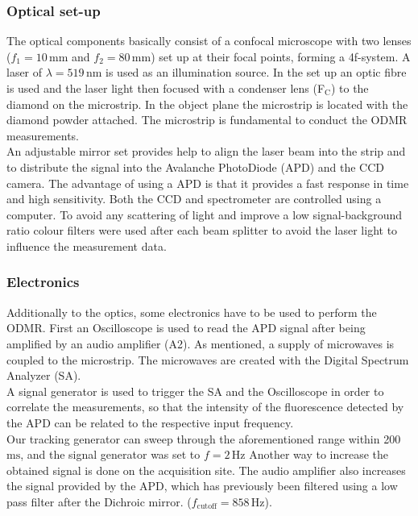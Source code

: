  \subsubsection{Optical set-up}
 
The optical components basically consist of a confocal microscope with two lenses ($f_{1}=10\,\mathrm{mm}$ and $f_{2}=80\,\mathrm{mm}$) set up at their focal points, forming a 4f-system. A laser of $\lambda=519\,\mathrm{nm}$ is used as an illumination source. In the set up an optic fibre is used and the laser light then focused with a condenser lens (F$_\mathrm{C}$) to the diamond on the microstrip.
In the object plane the microstrip is located with the diamond powder attached. The microstrip is fundamental to conduct the ODMR measurements.\\

An adjustable mirror set provides help to align the laser beam into the strip and to distribute the signal into the Avalanche PhotoDiode (APD) and the CCD camera. The advantage of using a APD is that it provides a fast response in time and high sensitivity. Both the CCD and spectrometer are controlled using a computer. To avoid any scattering of light and improve a low signal-background ratio colour filters were used after each beam splitter to avoid the laser light to influence the measurement data.

\subsubsection{Electronics}

Additionally to the optics, some electronics have to be used to perform the ODMR. First an Oscilloscope is used to read the APD signal after being amplified by an audio amplifier (A2). As mentioned, a supply of microwaves is coupled to the microstrip. The microwaves are created with the Digital Spectrum Analyzer (SA).\\

A signal generator is used to trigger the SA and the Oscilloscope in order to correlate the measurements, so that the intensity of the fluorescence detected by the APD can be related to the respective input frequency.\\
 
Our tracking generator can sweep through the aforementioned range within 200 $\mathrm{ms}$, and  the signal generator was set to $f=2\,\mathrm{Hz}$  Another way to increase the obtained signal is done on the acquisition site. The audio amplifier also increases the signal provided by the APD, which has previously been filtered using a low pass filter after the Dichroic mirror. ($f_\mathrm{cutoff}=858\,\mathrm{Hz}$). \\
 
